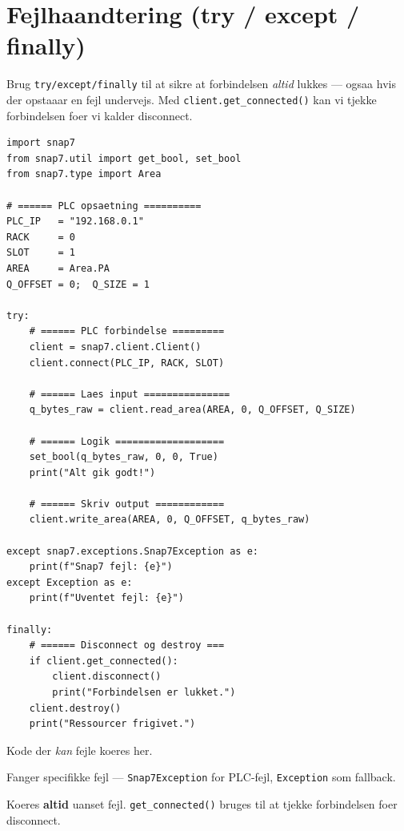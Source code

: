 \documentclass[12pt, a4paper]{article}
\begin{document}
\clearpage
\section{Fejlhaandtering (try / except / finally)}

Brug \texttt{try/except/finally} til at sikre at forbindelsen
\emph{altid} lukkes --- ogsaa hvis der opstaaar en fejl undervejs.
Med \texttt{client.get\_connected()} kan vi tjekke forbindelsen foer vi
kalder disconnect.

\begin{tcolorbox}[pythonbox, title={\faPython\quad Kode 5 --- Robust fejlhaandtering}]
\begin{verbatim}
import snap7
from snap7.util import get_bool, set_bool
from snap7.type import Area

# ====== PLC opsaetning ==========
PLC_IP   = "192.168.0.1"
RACK     = 0
SLOT     = 1
AREA     = Area.PA
Q_OFFSET = 0;  Q_SIZE = 1

try:
    # ====== PLC forbindelse =========
    client = snap7.client.Client()
    client.connect(PLC_IP, RACK, SLOT)

    # ====== Laes input ===============
    q_bytes_raw = client.read_area(AREA, 0, Q_OFFSET, Q_SIZE)

    # ====== Logik ===================
    set_bool(q_bytes_raw, 0, 0, True)
    print("Alt gik godt!")

    # ====== Skriv output ============
    client.write_area(AREA, 0, Q_OFFSET, q_bytes_raw)

except snap7.exceptions.Snap7Exception as e:
    print(f"Snap7 fejl: {e}")
except Exception as e:
    print(f"Uventet fejl: {e}")

finally:
    # ====== Disconnect og destroy ===
    if client.get_connected():
        client.disconnect()
        print("Forbindelsen er lukket.")
    client.destroy()
    print("Ressourcer frigivet.")
\end{verbatim}
\end{tcolorbox}

\begin{tcolorbox}[infobox, title={\faInfoCircle\quad try / except / finally forklaret}]
\begin{description}[leftmargin=2.2cm, style=nextline]
  \item[\texttt{try}]     Kode der \textit{kan} fejle koeres her.
  \item[\texttt{except}]  Fanger specifikke fejl ---
    \texttt{Snap7Exception} for PLC-fejl, \texttt{Exception} som fallback.
  \item[\texttt{finally}] Koeres \textbf{altid} uanset fejl.
    \texttt{get\_connected()} bruges til at tjekke forbindelsen foer disconnect.
\end{description}
\end{tcolorbox}
\end{document}
